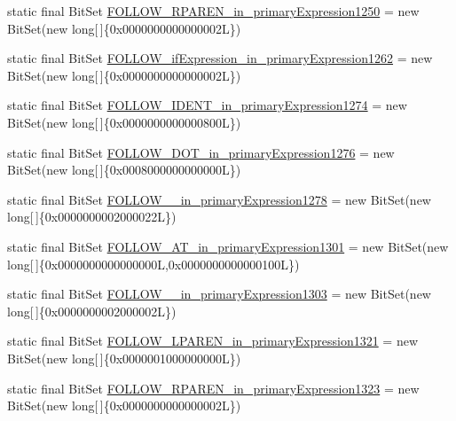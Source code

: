 \begin{DoxyCompactItemize}
\item 
static final Bit\-Set \hyperlink{classorg_1_1tzi_1_1use_1_1parser_1_1ocl_1_1_o_c_l_parser_a7904df1749dff8223d07c8dc6373decf}{F\-O\-L\-L\-O\-W\-\_\-\-R\-P\-A\-R\-E\-N\-\_\-in\-\_\-primary\-Expression1250} = new Bit\-Set(new long\mbox{[}$\,$\mbox{]}\{0x0000000000000002\-L\})
\item 
static final Bit\-Set \hyperlink{classorg_1_1tzi_1_1use_1_1parser_1_1ocl_1_1_o_c_l_parser_a2f32edb05860a2eb2e480eb481c4c11d}{F\-O\-L\-L\-O\-W\-\_\-if\-Expression\-\_\-in\-\_\-primary\-Expression1262} = new Bit\-Set(new long\mbox{[}$\,$\mbox{]}\{0x0000000000000002\-L\})
\item 
static final Bit\-Set \hyperlink{classorg_1_1tzi_1_1use_1_1parser_1_1ocl_1_1_o_c_l_parser_a4d84e2c5425d36ba2095300bdca2c6bf}{F\-O\-L\-L\-O\-W\-\_\-\-I\-D\-E\-N\-T\-\_\-in\-\_\-primary\-Expression1274} = new Bit\-Set(new long\mbox{[}$\,$\mbox{]}\{0x0000000000000800\-L\})
\item 
static final Bit\-Set \hyperlink{classorg_1_1tzi_1_1use_1_1parser_1_1ocl_1_1_o_c_l_parser_a8cbf3075de1ebfa0be31198bb9c50b3e}{F\-O\-L\-L\-O\-W\-\_\-\-D\-O\-T\-\_\-in\-\_\-primary\-Expression1276} = new Bit\-Set(new long\mbox{[}$\,$\mbox{]}\{0x0008000000000000\-L\})
\item 
static final Bit\-Set \hyperlink{classorg_1_1tzi_1_1use_1_1parser_1_1ocl_1_1_o_c_l_parser_ae4c09c99b915a349ae5eb8f08378f65f}{F\-O\-L\-L\-O\-W\-\_\-\_\-in\-\_\-primary\-Expression1278} = new Bit\-Set(new long\mbox{[}$\,$\mbox{]}\{0x0000000002000022\-L\})
\item 
static final Bit\-Set \hyperlink{classorg_1_1tzi_1_1use_1_1parser_1_1ocl_1_1_o_c_l_parser_af27a64f7c0f7e10174f0d152750b2cf8}{F\-O\-L\-L\-O\-W\-\_\-\-A\-T\-\_\-in\-\_\-primary\-Expression1301} = new Bit\-Set(new long\mbox{[}$\,$\mbox{]}\{0x0000000000000000\-L,0x0000000000000100\-L\})
\item 
static final Bit\-Set \hyperlink{classorg_1_1tzi_1_1use_1_1parser_1_1ocl_1_1_o_c_l_parser_a65b620fba83d0a2cf1dd24b7bf3cabbf}{F\-O\-L\-L\-O\-W\-\_\-\_\-in\-\_\-primary\-Expression1303} = new Bit\-Set(new long\mbox{[}$\,$\mbox{]}\{0x0000000002000002\-L\})
\item 
static final Bit\-Set \hyperlink{classorg_1_1tzi_1_1use_1_1parser_1_1ocl_1_1_o_c_l_parser_a55693c1a171410826110c2861b0c3643}{F\-O\-L\-L\-O\-W\-\_\-\-L\-P\-A\-R\-E\-N\-\_\-in\-\_\-primary\-Expression1321} = new Bit\-Set(new long\mbox{[}$\,$\mbox{]}\{0x0000001000000000\-L\})
\item 
static final Bit\-Set \hyperlink{classorg_1_1tzi_1_1use_1_1parser_1_1ocl_1_1_o_c_l_parser_a64dc30563a0f94fecbdad778759283a3}{F\-O\-L\-L\-O\-W\-\_\-\-R\-P\-A\-R\-E\-N\-\_\-in\-\_\-primary\-Expression1323} = new Bit\-Set(new long\mbox{[}$\,$\mbox{]}\{0x0000000000000002\-L\})

\end{DoxyCompactItemize}
